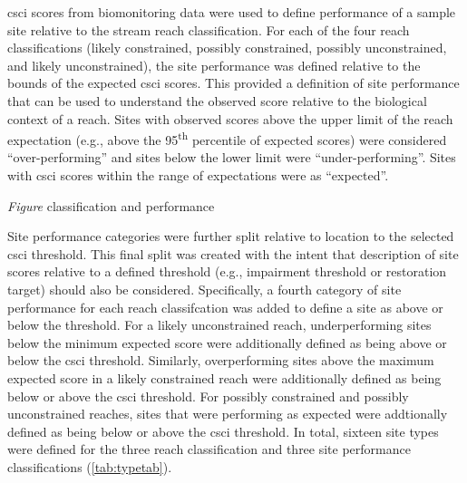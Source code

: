 \documentclass[]{article}
\begin{document}
\ac{csci} scores from biomonitoring data were used to define performance
of a sample site relative to the stream reach classification. For each
of the four reach classifications (likely constrained, possibly
constrained, possibly unconstrained, and likely unconstrained), the site
performance was defined relative to the bounds of the expected \ac{csci}
scores. This provided a definition of site performance that can be used
to understand the observed score relative to the biological context of a
reach. Sites with observed scores above the upper limit of the reach
expectation (e.g., above the 95\textsuperscript{th} percentile of
expected scores) were considered ``over-performing'' and sites below the
lower limit were ``under-performing''. Sites with \ac{csci} scores
within the range of expectations were as ``expected''.

\emph{Figure} classification and performance

Site performance categories were further split relative to location to
the selected \ac{csci} threshold. This final split was created with the
intent that description of site scores relative to a defined threshold
(e.g., impairment threshold or restoration target) should also be
considered. Specifically, a fourth category of site performance for each
reach classifcation was added to define a site as above or below the
threshold. For a likely unconstrained reach, underperforming sites below
the minimum expected score were additionally defined as being above or
below the \ac{csci} threshold. Similarly, overperforming sites above the
maximum expected score in a likely constrained reach were additionally
defined as being below or above the \ac{csci} threshold. For possibly
constrained and possibly unconstrained reaches, sites that were
performing as expected were addtionally defined as being below or above
the \ac{csci} threshold. In total, sixteen site types were defined for
the three reach classification and three site performance
classifications (\cref{tab:typetab}).
\end{document}
